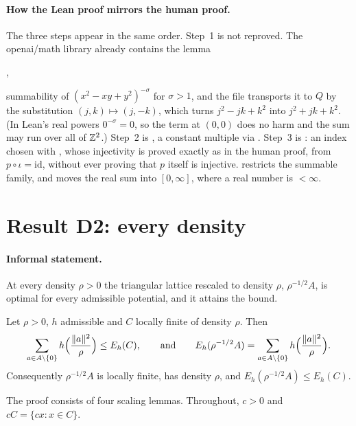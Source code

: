 \paragraph{How the Lean proof mirrors the human proof.} The three steps appear in the same order. Step~1 is not reproved.
The openai/math library already contains the lemma
\begin{center},\end{center}
\noindent summability of
$(x^2-xy+y^2)^{-\sigma}$ for $\sigma>1$, and the file transports it to $Q$ by the substitution $(j,k)\mapsto(j,-k)$,
which turns $j^2-jk+k^2$ into $j^2+jk+k^2$. (In Lean's real powers $0^{-\sigma}=0$, so the term at $(0,0)$ does no harm
and the sum may run over all of $\mathbb{Z}^2$.) Step~2 is , a constant multiple via . Step~3 is
: an index chosen with , whose injectivity is proved exactly as in the human proof,
from $p\circ\iota=\mathrm{id}$, without ever proving that $p$ itself is injective. 
restricts the summable family, and  moves the real sum into $[0,\infty]$, where a
real number is $<\infty$.

\section{Result D2: every density}\label{ch2:sec:d2}

\paragraph{Informal statement.} At every density $\rho>0$ the triangular lattice rescaled to density $\rho$,
$\rho^{-1/2}A$, is optimal for every admissible potential, and it attains the bound.

\begin{theorem}[D2]\label{ch2:thm:d2}
Let $\rho>0$, $h$ admissible and $C$ locally finite of density $\rho$. Then
\[
\sum_{a\in A\setminus\{0\}}h\Bigl(\frac{\|a\|^2}{\rho}\Bigr)\le E_h(C),
\qquad\text{and}\qquad E_h(\rho^{-1/2}A)=\sum_{a\in A\setminus\{0\}}h\Bigl(\frac{\|a\|^2}{\rho}\Bigr).
\]
Consequently $\rho^{-1/2}A$ is locally finite, has density $\rho$, and $E_h(\rho^{-1/2}A)\le E_h(C)$.
\end{theorem}

The proof consists of four scaling lemmas. Throughout, $c>0$ and $cC=\{cx:x\in C\}$.

